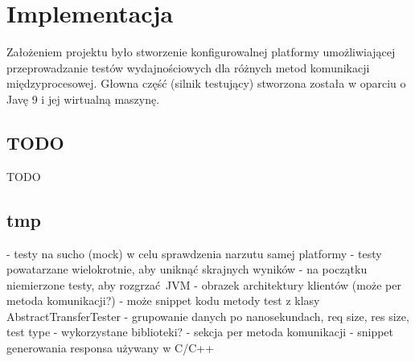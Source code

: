 \chapter{Implementacja}

Założeniem projektu było stworzenie konfigurowalnej platformy umożliwiającej przeprowadzanie testów wydajnościowych dla różnych metod komunikacji międzyprocesowej. Głowna część (silnik testujący) stworzona została w oparciu o Javę 9 i jej wirtualną maszynę.


\section{TODO}

TODO


\section{tmp}

- testy na sucho (mock) w celu sprawdzenia narzutu samej platformy
- testy powatarzane wielokrotnie, aby uniknąć skrajnych wyników
- na początku niemierzone testy, aby rozgrzać JVM
- obrazek architektury klientów (może per metoda komunikacji?)
- może snippet kodu metody test z klasy AbstractTransferTester
- grupowanie danych po nanosekundach, req size, res size, test type
- wykorzystane biblioteki?
- sekcja per metoda komunikacji
- snippet generowania responsa używany w C/C++
